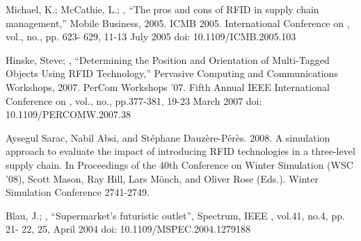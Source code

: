 \documentclass[10pt,a4paper]{article}
\begin{document}
\begin{thebibliography}{9}

  Michael, K.; McCathie, L.; , ``The pros and cons of RFID in supply chain management,'' Mobile Business, 2005. ICMB 2005. International Conference on , vol., no., pp. 623- 629, 11-13 July 2005
doi: 10.1109/ICMB.2005.103


Hinske, Steve; , ``Determining the Position and Orientation of Multi-Tagged Objects Using RFID Technology,'' Pervasive Computing and Communications Workshops, 2007. PerCom Workshops '07. Fifth Annual IEEE International Conference on , vol., no., pp.377-381, 19-23 March 2007
doi: 10.1109/PERCOMW.2007.38


Aysegul Sarac, Nabil Absi, and Stéphane Dauzère-Pérès. 2008. A simulation approach to evaluate the impact of introducing RFID technologies in a three-level supply chain. In Proceedings of the 40th Conference on Winter Simulation (WSC '08), Scott Mason, Ray Hill, Lars Mönch, and Oliver Rose (Eds.). Winter Simulation Conference 2741-2749.


Blau, J.; , ``Supermarket's futuristic outlet'', Spectrum, IEEE , vol.41, no.4, pp. 21- 22, 25, April 2004
doi: 10.1109/MSPEC.2004.1279188

\end{thebibliography}
\end{document}
